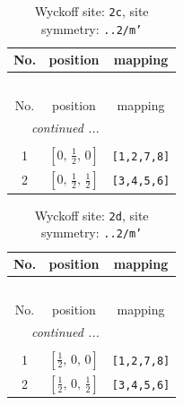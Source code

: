 \documentclass[fleqn,8pt]{jsarticle}
\begin{document}
\renewcommand{\arraystretch}{1.2}
\begin{longtable}{ccc}
\caption{Wyckoff site: {\tt 2c}, site symmetry: {\tt ..2/m'}}
 \\
 \hline \hline
No. & position & mapping \\ \hline \endfirsthead

\multicolumn{2}{l}{\tablename\ \thetable{}} \\
 \hline \hline
No. & position & mapping \\ \hline \endhead

 \hline \hline
\multicolumn{2}{r}{\footnotesize\it continued ...} \\ \endfoot

 \hline \hline
\multicolumn{2}{r}{} \\ \endlastfoot

1 & $\left[ 0,\, \frac{1}{2},\, 0 \right]$ & {\tt [1,2,7,8]} \\ \hline
2 & $\left[ 0,\, \frac{1}{2},\, \frac{1}{2} \right]$ & {\tt [3,4,5,6]} \\
\end{longtable}
\renewcommand{\arraystretch}{1.2}
\begin{longtable}{ccc}
\caption{Wyckoff site: {\tt 2d}, site symmetry: {\tt ..2/m'}}
 \\
 \hline \hline
No. & position & mapping \\ \hline \endfirsthead

\multicolumn{2}{l}{\tablename\ \thetable{}} \\
 \hline \hline
No. & position & mapping \\ \hline \endhead

 \hline \hline
\multicolumn{2}{r}{\footnotesize\it continued ...} \\ \endfoot

 \hline \hline
\multicolumn{2}{r}{} \\ \endlastfoot

1 & $\left[ \frac{1}{2},\, 0,\, 0 \right]$ & {\tt [1,2,7,8]} \\ \hline
2 & $\left[ \frac{1}{2},\, 0,\, \frac{1}{2} \right]$ & {\tt [3,4,5,6]} \\
\end{longtable}
\renewcommand{\arraystretch}{1.2}
\end{document}
